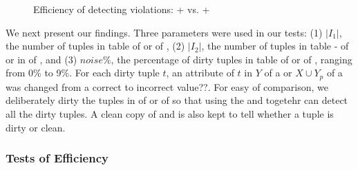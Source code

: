 \begin{figure}[tb!]
  \quad
  \quad
  \caption{Efficiency of detecting violations: \pCFDs + \pCINDs vs. \CFDs + \CINDs}\label{fig_exp1_both}
  \vspace{-3ex}
\end{figure}

We next present our findings.
%
Three parameters were used in our tests:
(1) $|I_1|$, the number of tuples in table  of \hosp or  of \dblp,
(2) $|I_2|$, the number of tuples in table - of \hosp or in  of \dblp, and
(3) $noise\%$, the percentage of dirty tuples in table  of \hosp or   of \dblp, ranging from 0\% to 9\%.
{For each dirty tuple $t$, an attribute of $t$ in $Y$ of a \pCFD or $X \cup Y_p$ of a \pCIND was changed from a correct to incorrect value??}.
For easy of comparison, we deliberately dirty the tuples in  of \hosp or   of \dblp so that using the \pCFDs and \pCINDs togetehr can detect all the dirty tuples. A clean copy of \hosp and \dblp is also kept to tell whether a tuple is dirty or clean.


\vspace{-1ex}
\subsubsection{Tests of Efficiency}


